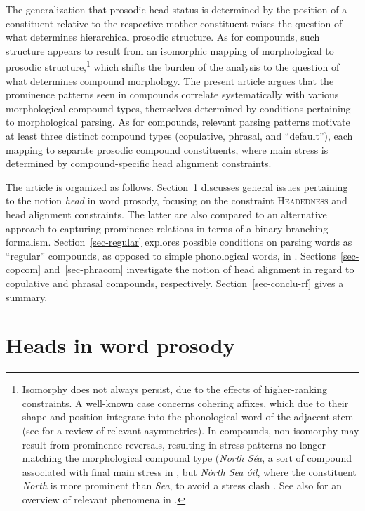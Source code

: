 \documentclass[output=paper
 ,nobabel
 ,draftmode
 ,colorlinks, citecolor=brown
]{langscibook}
\begin{document}
\largerpage
The generalization that prosodic head status is determined by the position of a constituent relative
to the respective mother constituent raises the question of what determines hierarchical prosodic
structure. As for compounds, such structure appears to result from an isomorphic mapping of
morphological to prosodic structure,\footnote{\label{fn-isomorphy}Isomorphy does not always persist,
  due to the effects of higher-ranking constraints. A well-known case concerns cohering affixes,
  which due to their shape and position integrate into the phonological word of the adjacent stem
  (see \citet{Raffelsiefen2022} for a review of relevant asymmetries). In compounds, non-isomorphy
  may result from prominence reversals, resulting in stress patterns no longer matching the
  morphological compound type (\eg \emph{North Séa}, a sort of compound associated with final main
  stress in , but \emph{Nòrth Sea óil}, where the constituent \emph{North} is more prominent than
  \emph{Sea}, to avoid a stress clash \citep[137]{Fudge1984}. See also \citet{Gussenhoven2011} for
  an overview of relevant phenomena in .} which shifts the burden of the analysis to the
question of what determines compound morphology. The present article argues that the prominence patterns seen in compounds
correlate systematically with various morphological compound types, themselves
determined by conditions pertaining to morphological parsing. As for  compounds, relevant
parsing patterns motivate at least three distinct compound types (copulative, phrasal, and
``default''), each mapping to separate prosodic compound constituents, where main stress is
determined by compound-specific head alignment constraints.    

The article is organized as follows. Section~\ref{sec-wordprosody} discusses general issues pertaining to the notion \emph{head} in word prosody, focusing on the constraint \textsc{Headedness} and head alignment constraints. The latter are also compared to an alternative approach to capturing prominence relations in terms of a binary branching formalism.  Section~\ref{sec-regular} explores possible conditions on parsing words as ``regular'' compounds, as opposed to simple phonological words, in . Sections~\ref{sec-copcom} and~\ref{sec-phracom} investigate the notion of head alignment in regard to copulative and phrasal compounds, respectively. Section~\ref{sec-conclu-rf} gives a summary. 

\section{Heads in word prosody}
\label{sec-wordprosody}
\end{document}
